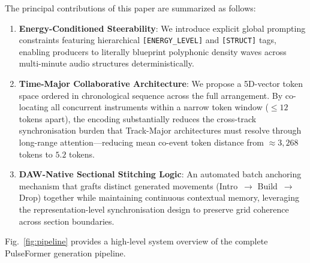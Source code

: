 \documentclass[conference]{IEEEtran}
\begin{document}
The principal contributions of this paper are summarized as follows:
\begin{enumerate}
    \item \textbf{Energy-Conditioned Steerability}: We introduce explicit global prompting constraints featuring hierarchical \texttt{[ENERGY\_LEVEL]} and \texttt{[STRUCT]} tags, enabling producers to literally blueprint polyphonic density waves across multi-minute audio structures deterministically.
    \item \textbf{Time-Major Collaborative Architecture}: We propose a 5D-vector token space ordered in chronological sequence across the full arrangement. By co-locating all concurrent instruments within a narrow token window ($\leq\!12$ tokens apart), the encoding substantially reduces the cross-track synchronisation burden that Track-Major architectures must resolve through long-range attention---reducing mean co-event token distance from $\approx\!3{,}268$ tokens to $5.2$ tokens.
    \item \textbf{DAW-Native Sectional Stitching Logic}: An automated batch anchoring mechanism that grafts distinct generated movements (Intro~$\to$ Build~$\to$ Drop) together while maintaining continuous contextual memory, leveraging the representation-level synchronisation design to preserve grid coherence across section boundaries.
\end{enumerate}

Fig.~\ref{fig:pipeline} provides a high-level system overview of the complete PulseFormer generation pipeline.
\end{document}

